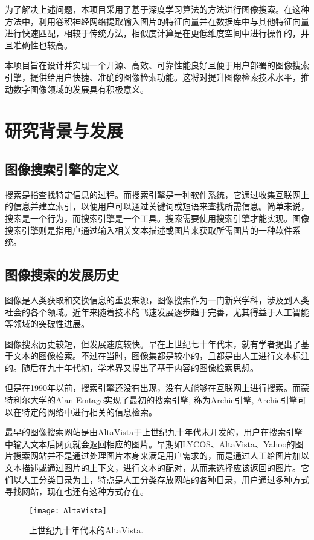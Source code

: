 \documentclass[bachelor_p]{hdu-thesis}
\begin{document}
为了解决上述问题，本项目采用了基于深度学习算法的方法进行图像搜索。在这种方法中，利用卷积神经网络提取输入图片的特征向量并在数据库中与其他特征向量进行快速匹配，相较于传统方法，相似度计算是在更低维度空间中进行操作的，并且准确性也较高。

本项目旨在设计并实现一个开源、高效、可靠性能良好且便于用户部署的图像搜索引擎，提供给用户快捷、准确的图像检索功能。这将对提升图像检索技术水平，推动数字图像领域的发展具有积极意义。
\section{研究背景与发展}
\subsection{图像搜索引擎的定义}

搜索是指查找特定信息的过程。而搜索引擎是一种软件系统，它通过收集互联网上的信息并建立索引，以便用户可以通过关键词或短语来查找所需信息。简单来说，搜索是一个行为，而搜索引擎是一个工具。搜索需要使用搜索引擎才能实现。图像搜索引擎则是指用户通过输入相关文本描述或图片来获取所需图片的一种软件系统。

\subsection{图像搜索的发展历史}
图像是人类获取和交换信息的重要来源，图像搜索作为一门新兴学科，涉及到人类社会的各个领域。近年来随着技术的飞速发展逐步趋于完善，尤其得益于人工智能等领域的突破性进展。

图像搜索历史较短，但发展速度较快。早在上世纪七十年代末，就有学者提出了基于文本的图像检索。不过在当时，图像集都是较小的，且都是由人工进行文本标注的。随后在九十年代初，学术界又提出了基于内容的图像检索思想。

但是在1990年以前，搜索引擎还没有出现，没有人能够在互联网上进行搜索。而蒙特利尔大学的Alan Emtage实现了最初的搜索引擎, 称为Archie引擎, Archie引擎可以在特定的网络中进行相关的信息检索\citep{search2}。

最早的图像搜索网站是由AltaVista于上世纪九十年代末开发的，用户在搜索引擎中输入文本后网页就会返回相应的图片。早期如LYCOS、AltaVista、Yahoo的图片搜索网站并不是通过处理图片本身来满足用户需求的，而是通过人工给图片加以文本描述或通过图片的上下文，进行文本的配对，从而来选择应该返回的图片。它们以人工分类目录为主，特点是人工分类存放网站的各种目录，用户通过多种方式寻找网站，现在也还有这种方式存在。

\begin{figure}[!htb]
  \centering
  \texttt{[image: AltaVista]}
  \caption{上世纪九十年代末的AltaVista.}
  \label{fig_AltaVista}
\end{figure}
\end{document}
